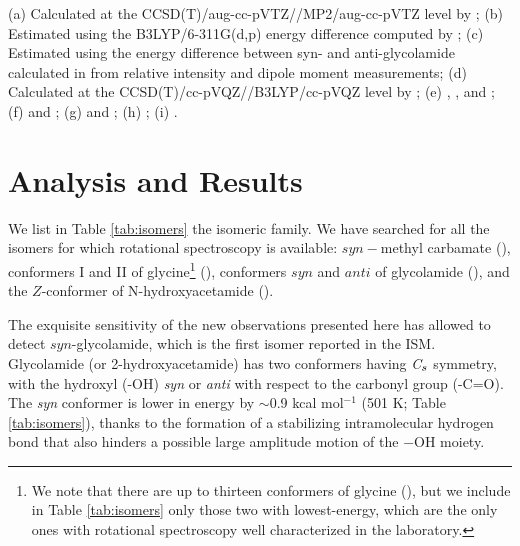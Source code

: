 \documentclass[twocolumn]{aastex63}
\begin{document}
\begin{table}
{(a) Calculated at the CCSD(T)/aug-cc-pVTZ//MP2/aug-cc-pVTZ level by \citet{sanz-novo2019};}
{(b) Estimated using the B3LYP/6-311G(d,p) energy difference computed by \citet{lattelais2011};}
{(c) Estimated using the energy difference between syn- and anti-glycolamide calculated in \citet{maris2004} from relative intensity and dipole moment measurements;}
{(d) Calculated at the CCSD(T)/cc-pVQZ//B3LYP/cc-pVQZ level by \citet{lattelais2011};}
{(e) \citet{Groner2007}, \citet{ilyushin2006}, \citet{marstokk1999} and \citet{bakri2002};}
{(f) \citet{lovas1995} and \citet{ilyushin2005_glycine};}
{(g) \citet{sanz-novo2020} and \citet{maris2004};}
{(h) \citet{sanz-novo2022b};}
{(i) \citet{lovas1995}.}
\end{table}


\section{Analysis and Results} 
\label{sec:analysis}

We list in Table \ref{tab:isomers} the  isomeric family. We have searched for all the isomers for which rotational spectroscopy is available: $syn-$methyl carbamate (), conformers I and II of glycine\footnote{We note that there are up to thirteen conformers of glycine (\citealt{csaszar1992}), but we include in Table \ref{tab:isomers} only those two with lowest-energy, which are the only ones with rotational spectroscopy well characterized in the laboratory.} (), conformers $syn$ and $anti$ of glycolamide (), and the $Z$-conformer of N-hydroxyacetamide (). 

The exquisite sensitivity of the new observations presented here has allowed to detect $syn$-glycolamide, which is the first  isomer reported in the ISM. Glycolamide (or 2-hydroxyacetamide) has two conformers having {\it C}$_{s\rm}$ symmetry, with the hydroxyl (-OH) {\it syn} or {\it anti} with respect to the carbonyl group (-C=O). The {\it syn} conformer is lower in energy by $\sim$0.9 kcal mol$^{-1}$ (501 K; Table \ref{tab:isomers}), thanks to the formation of a stabilizing intramolecular hydrogen bond that also hinders a possible large amplitude motion of the $-$OH moiety.
\end{document}
